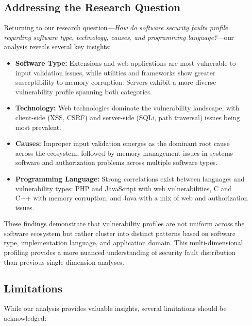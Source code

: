 \subsection{Addressing the Research Question}

Returning to our research question—\textit{How do software security faults profile regarding software type, technology, causes, and programming language?}—our analysis reveals several key insights:

\begin{itemize}
    \item \textbf{Software Type:} Extensions and web applications are most vulnerable to input validation issues, while utilities and frameworks show greater susceptibility to memory corruption. Servers exhibit a more diverse vulnerability profile spanning both categories.

    \item \textbf{Technology:} Web technologies dominate the vulnerability landscape, with client-side (XSS, CSRF) and server-side (SQLi, path traversal) issues being most prevalent.

    \item \textbf{Causes:} Improper input validation emerges as the dominant root cause across the ecosystem, followed by memory management issues in systems software and authorization problems across multiple software types.

    \item \textbf{Programming Language:} Strong correlations exist between languages and vulnerability types: PHP and JavaScript with web vulnerabilities, C and C++ with memory corruption, and Java with a mix of web and authorization issues.
\end{itemize}

These findings demonstrate that vulnerability profiles are not uniform across the software ecosystem but rather cluster into distinct patterns based on software type, implementation language, and application domain. This multi-dimensional profiling provides a more nuanced understanding of security fault distribution than previous single-dimension analyses.

\subsection{Limitations}

While our analysis provides valuable insights, several limitations should be acknowledged:

